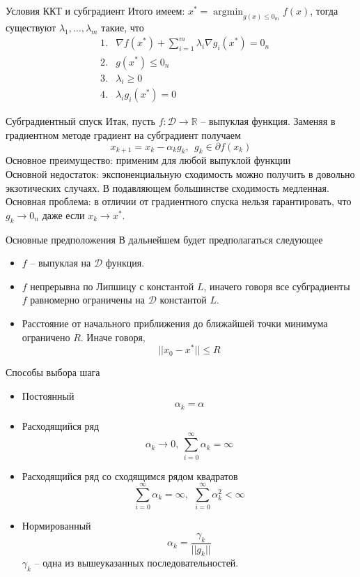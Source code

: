 \documentclass[10pt, handout]{beamer}
\DeclareMathOperator{\argmin}{argmin}
\begin{document}
\begin{frame}{Условия ККТ и субградиент}
Итого имеем: $x^*=\argmin_{g(x)\leq 0_m}f(x)$, тогда существуют $\lambda_1, \ldots, \lambda_m$ такие, что
\begin{align*}
& 1. & \nabla f(x^*)+\sum_{i=1}^m \lambda_i \nabla g_i(x^*)=0_n\\
& 2. & g(x^*)\leq 0_n \\
& 3. & \lambda_i\geq 0 \\
& 4. & \lambda_ig_i(x^*)=0
\end{align*}
\end{frame}

\begin{frame}{Субградиентный спуск}
Итак, пусть $f:\mathcal{D}\rightarrow \mathbb{R}$ -- выпуклая функция. Заменяя в градиентном методе градиент на субградиент получаем
\begin{equation}\label{subgradient_descent}
x_{k+1}=x_k-\alpha_kg_k,~~g_k\in\partial f(x_k)
\end{equation}
\pause
\vspace{1em}
Основное преимущество: применим для любой выпуклой функции\\
\pause
\vspace{1em}
Основной недостаток: экспоненциальную сходимость можно получить в довольно экзотических случаях. В подавляющем большинстве сходимость медленная.\\
\pause
\vspace{1em}
Основная проблема: в отличии от градиентного спуска нельзя гарантировать, что $g_k\rightarrow 0_n$ даже если $x_k\rightarrow x^*$.
\end{frame}

\begin{frame}{Основные предположения}
В дальнейшем будет предполагаться следующее
\begin{itemize}
\item $f$ -- выпуклая на $\mathcal{D}$ функция.
\item $f$ непрерывна по Липшицу с константой $L$, иначего говоря все субградиенты $f$ равномерно ограничены на $\mathcal{D}$ константой $L$.
\item Расстояние от начального приближения до ближайшей точки минимума ограничено $R$. Иначе говоря,
$$
||x_0-x^*||\leq R
$$
\end{itemize}
\end{frame}

\begin{frame}{Способы выбора шага}

\begin{itemize}
\item Постоянный
$$
\alpha_k=\alpha
$$
\item Расходящийся ряд
$$
\alpha_k\rightarrow 0,~\sum_{i=0}^\infty\alpha_k=\infty
$$
\item Расходящийся ряд со сходящимся рядом квадратов
$$
\sum_{i=0}^\infty\alpha_k=\infty,~~\sum_{i=0}^\infty\alpha_k^2<\infty
$$
\item Нормированный
$$
\alpha_k=\frac{\gamma_k}{||g_k||}
$$
$\gamma_k$ -- одна из вышеуказанных последовательностей.
\end{itemize}
\end{frame}
\end{document}

